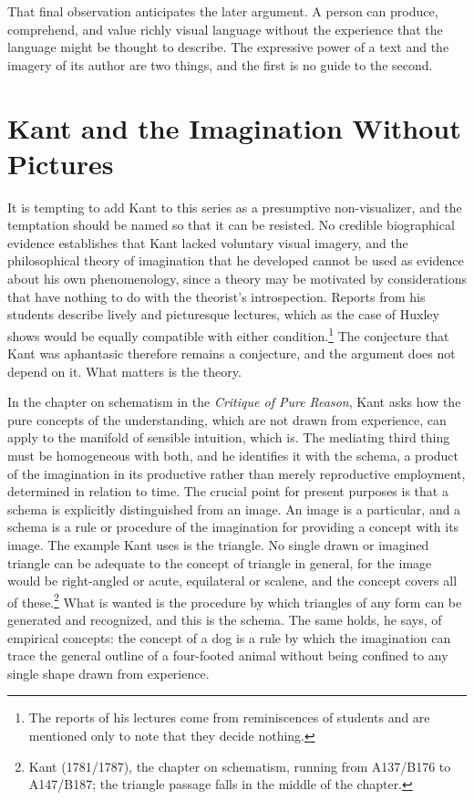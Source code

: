 \documentclass[11pt]{article}
\theoremstyle{remark}
\begin{document}
That final observation anticipates the later argument. A person can produce, comprehend, and value richly visual language without the experience that the language might be thought to describe. The expressive power of a text and the imagery of its author are two things, and the first is no guide to the second.

\section{Kant and the Imagination Without Pictures}

It is tempting to add Kant to this series as a presumptive non-visualizer, and the temptation should be named so that it can be resisted. No credible biographical evidence establishes that Kant lacked voluntary visual imagery, and the philosophical theory of imagination that he developed cannot be used as evidence about his own phenomenology, since a theory may be motivated by considerations that have nothing to do with the theorist's introspection. Reports from his students describe lively and picturesque lectures, which as the case of Huxley shows would be equally compatible with either condition.\footnote{The reports of his lectures come from reminiscences of students and are mentioned only to note that they decide nothing.} The conjecture that Kant was aphantasic therefore remains a conjecture, and the argument does not depend on it. What matters is the theory.

In the chapter on schematism in the \emph{Critique of Pure Reason}, Kant asks how the pure concepts of the understanding, which are not drawn from experience, can apply to the manifold of sensible intuition, which is. The mediating third thing must be homogeneous with both, and he identifies it with the schema, a product of the imagination in its productive rather than merely reproductive employment, determined in relation to time. The crucial point for present purposes is that a schema is explicitly distinguished from an image. An image is a particular, and a schema is a rule or procedure of the imagination for providing a concept with its image. The example Kant uses is the triangle. No single drawn or imagined triangle can be adequate to the concept of triangle in general, for the image would be right-angled or acute, equilateral or scalene, and the concept covers all of these.\footnote{Kant (1781/1787), the chapter on schematism, running from A137/B176 to A147/B187; the triangle passage falls in the middle of the chapter.} What is wanted is the procedure by which triangles of any form can be generated and recognized, and this is the schema. The same holds, he says, of empirical concepts: the concept of a dog is a rule by which the imagination can trace the general outline of a four-footed animal without being confined to any single shape drawn from experience.
\end{document}
